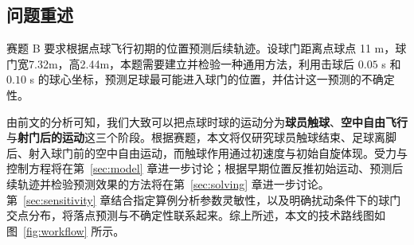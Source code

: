 \documentclass[12pt,letterpaper]{article}
\begin{document}
\subsection{问题重述}
赛题 B 要求根据点球飞行初期的位置预测后续轨迹。设球门距离点球点 11 m，球门宽7.32m，高2.44m，本题需要建立并检验一种通用方法，利用击球后 $0.05$ s 和 $0.10$ s 的球心坐标，预测足球最可能进入球门的位置，并估计这一预测的不确定性。

由前文的分析可知，我们大致可以把点球时球的运动分为\textbf{球员触球}、\textbf{空中自由飞行}与\textbf{射门后的运动}这三个阶段。根据赛题，本文将仅研究球员触球结束、足球离脚后、射入球门前的空中自由运动，而触球作用通过初速度与初始自旋体现。受力与控制方程将在第~\ref{sec:model} 章进一步讨论；根据早期位置反推初始运动、预测后续轨迹并检验预测效果的方法将在第~\ref{sec:solving} 章进一步讨论。第~\ref{sec:sensitivity} 章结合指定算例分析参数灵敏性，以及明确扰动条件下的球门交点分布，将落点预测与不确定性联系起来。综上所述，本文的技术路线图如图~\ref{fig:workflow} 所示。
\end{document}
